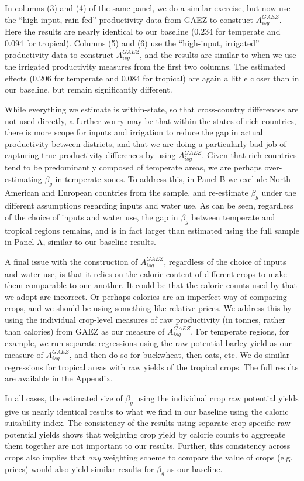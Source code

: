 \documentclass[11pt]{article}
\begin{document}
In columns (3) and (4) of the same panel, we do a similar exercise, but now use the ``high-input, rain-fed'' productivity data from GAEZ to construct $A_{isg}^{GAEZ}$. Here the results are nearly identical to our baseline (0.234 for temperate and 0.094 for tropical). Columns (5) and (6) use the ``high-input, irrigated'' productivity data to construct $A_{isg}^{GAEZ}$, and the results are similar to when we use the irrigated productivity measures from the first two columns. The estimated effects (0.206 for temperate and 0.084 for tropical) are again a little closer than in our baseline, but remain significantly different.

While everything we estimate is within-state, so that cross-country differences are not used directly, a further worry may be that within the states of rich countries, there is more scope for inputs and irrigation to reduce the gap in actual productivity between districts, and that we are doing a particularly bad job of capturing true productivity differences by using $A_{isg}^{GAEZ}$. Given that rich countries tend to be predominantly composed of temperate areas, we are perhaps over-estimating $\beta_g$ in temperate zones. To address this, in Panel B we exclude North American and European countries from the sample, and re-estimate $\beta_g$ under the different assumptions regarding inputs and water use. As can be seen, regardless of the choice of inputs and water use, the gap in $\beta_g$ between temperate and tropical regions remains, and is in fact larger than estimated using the full sample in Panel A, similar to our baseline results.

A final issue with the construction of $A^{GAEZ}_{isg}$, regardless of the choice of inputs and water use, is that it relies on the calorie content of different crops to make them comparable to one another. It could be that the calorie counts used by \cite{galorozak2016} that we adopt are incorrect. Or perhaps calories are an imperfect way of comparing crops, and we should be using something like relative prices. We address this by using the individual crop-level measures of raw productivity (in tonnes, rather than calories) from GAEZ as our measure of $A^{GAEZ}_{isg}$. For temperate regions, for example, we run separate regressions using the raw potential barley yield as our measure of $A^{GAEZ}_{isg}$, and then do so for buckwheat, then oats, etc. We do similar regressions for tropical areas with raw yields of the tropical crops. The full results are available in the Appendix. 

In all cases, the estimated size of $\beta_g$ using the individual crop raw potential yields give us nearly identical results to what we find in our baseline using the caloric suitability index. The consistency of the results using separate crop-specific raw potential yields shows that weighting crop yield by calorie counts to aggregate them together are not important to our results. Further, this consistency across crops also implies that \textit{any} weighting scheme to compare the value of crops (e.g. prices) would also yield similar results for $\beta_g$ as our baseline. 
\end{document}
